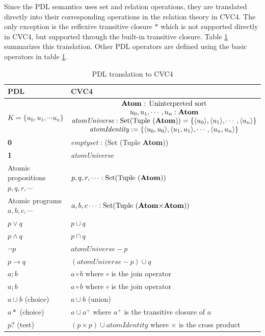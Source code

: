 \documentclass[12pt,a4paper]{article}
\begin{document}
Since the PDL semantics uses set and relation operations, they are translated directly into their corresponding operations in the relation theory in CVC4. The only exception is the reflexive transitive closure $*$ which is not supported directly in CVC4, but supported through the built-in transitive closure. Table \ref{tab:translation} summarizes this translation. Other PDL operators are defined using the basic operators in table \ref{tab:translation}. 

\begin{table}
\begin{center}
\begin{tabular}{ll} 
\toprule
PDL & CVC4 \\    
\midrule    
$K=\lbrace u_0, u_1, \cdots u_n \rbrace$ &  
$\begin{matrix}
\text{\textbf{Atom} : \text{Uninterpreted sort}} \\
u_0, u_1, \cdots, u_n: \textbf{Atom} \\
\textit{atomUniverse}: \text{Set(Tuple (\textbf{Atom}))} = \lbrace \langle u_0 \rangle, \langle u_1 \rangle, \cdots , \langle u_n \rangle \rbrace \\
\textit{atomIdentity}:  = \lbrace \langle u_0, u_0 \rangle, \langle u_1, u_1 \rangle, \cdots , \langle u_n, u_n \rangle \rbrace \\
\end{matrix}$ \\ \midrule   
\textbf{0} & \textit{emptyset} : (Set (Tuple \textbf{Atom})) \\
\textbf{1} & \textit{atomUniverse} \\
Atomic propositions $p, q, r, \cdots$ & $p, q, r, \cdots : \text{Set(Tuple (\textbf{Atom}))}$ \\
Atomic programs $a, b, c, \cdots$ & $a, b, c \cdots : \text{Set(Tuple (\textbf{Atom}$\times$\textbf{Atom}))}$ \\
$p \vee q$ & $p \cup q$ \\
$p \wedge q$ & $p \cap q$ \\
$\neg p$ & $\textit{atomUniverse} - p$ \\
$p \rightarrow q$ & $(\textit{atomUniverse}- p)\cup q$ \\
$a;b$ & $a \circ b$ where $\circ$ is the join operator\\
$a;b$ & $a \circ b$ where $\circ$ is the join operator\\
$a \cup b$ (choice) & $a \cup b$ (union)\\
$a*$ (choice) & $a \cup a^+$  where $a^+$ is the transitive closure of $a$\\
$p?$ (test) & $(p \times p) \cup \textit{atomIdentity}$ where $\times$ is the cross product\\
\bottomrule
\end{tabular}
\end{center}
\caption{PDL translation to CVC4} \label{tab:translation}
\end{table}
\end{document}
